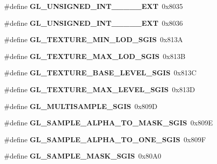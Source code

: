 \begin{DoxyCompactItemize}
\item 
\#define {\bfseries G\+L\+\_\+\+U\+N\+S\+I\+G\+N\+E\+D\+\_\+\+I\+N\+T\+\_\+\_\+\_\+\_\+\_\+\+E\+X\+T}~0x8035\label{_s_d_l__opengl_8h_a3671bf162ae762d9266ebd5512aff9eb}

\item 
\#define {\bfseries G\+L\+\_\+\+U\+N\+S\+I\+G\+N\+E\+D\+\_\+\+I\+N\+T\+\_\+\_\+\_\+\_\+\_\+\+E\+X\+T}~0x8036\label{_s_d_l__opengl_8h_abd7431873fdc607ff3a8b5c2b6531693}

\item 
\#define {\bfseries G\+L\+\_\+\+T\+E\+X\+T\+U\+R\+E\+\_\+\+M\+I\+N\+\_\+\+L\+O\+D\+\_\+\+S\+G\+I\+S}~0x813\+A\label{_s_d_l__opengl_8h_a433c7bd706b4078c1b649ea2eae9a6af}

\item 
\#define {\bfseries G\+L\+\_\+\+T\+E\+X\+T\+U\+R\+E\+\_\+\+M\+A\+X\+\_\+\+L\+O\+D\+\_\+\+S\+G\+I\+S}~0x813\+B\label{_s_d_l__opengl_8h_a99bdfce7c5356621a33180b4a539db3b}

\item 
\#define {\bfseries G\+L\+\_\+\+T\+E\+X\+T\+U\+R\+E\+\_\+\+B\+A\+S\+E\+\_\+\+L\+E\+V\+E\+L\+\_\+\+S\+G\+I\+S}~0x813\+C\label{_s_d_l__opengl_8h_a6cffbec20f615220cfe3c4c9a6023d9a}

\item 
\#define {\bfseries G\+L\+\_\+\+T\+E\+X\+T\+U\+R\+E\+\_\+\+M\+A\+X\+\_\+\+L\+E\+V\+E\+L\+\_\+\+S\+G\+I\+S}~0x813\+D\label{_s_d_l__opengl_8h_a08339bdcecc6c765c95c55df207abdf7}

\item 
\#define {\bfseries G\+L\+\_\+\+M\+U\+L\+T\+I\+S\+A\+M\+P\+L\+E\+\_\+\+S\+G\+I\+S}~0x809\+D\label{_s_d_l__opengl_8h_ab2bb2d97155be82a9efdd77243085da3}

\item 
\#define {\bfseries G\+L\+\_\+\+S\+A\+M\+P\+L\+E\+\_\+\+A\+L\+P\+H\+A\+\_\+\+T\+O\+\_\+\+M\+A\+S\+K\+\_\+\+S\+G\+I\+S}~0x809\+E\label{_s_d_l__opengl_8h_ab25a91683761a9d063c3298f41133b31}

\item 
\#define {\bfseries G\+L\+\_\+\+S\+A\+M\+P\+L\+E\+\_\+\+A\+L\+P\+H\+A\+\_\+\+T\+O\+\_\+\+O\+N\+E\+\_\+\+S\+G\+I\+S}~0x809\+F\label{_s_d_l__opengl_8h_a3ef686c0fa05a6337b1cacd916443870}

\item 
\#define {\bfseries G\+L\+\_\+\+S\+A\+M\+P\+L\+E\+\_\+\+M\+A\+S\+K\+\_\+\+S\+G\+I\+S}~0x80\+A0\label{_s_d_l__opengl_8h_a259d99ff0e18c7811cc01b98e9c51a37}


\end{DoxyCompactItemize}
